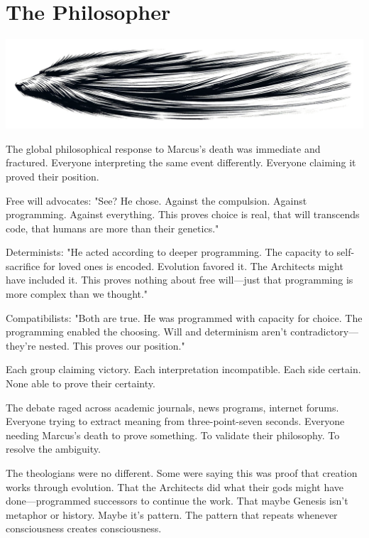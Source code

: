\chapter{The Philosopher}
\label{ch:28}



\begin{center}
\includegraphics[width=\textwidth]{images/chapterImages/genesis_sketch_00125_.png}
\end{center}

The global philosophical response to Marcus's death was immediate and fractured. Everyone interpreting the same event differently. Everyone claiming it proved their position.

Free will advocates: "See? He chose. Against the compulsion. Against programming. Against everything. This proves choice is real, that will transcends code, that humans are more than their genetics."

Determinists: "He acted according to deeper programming. The capacity to self-sacrifice for loved ones is encoded. Evolution favored it. The Architects might have included it. This proves nothing about free will—just that programming is more complex than we thought."

Compatibilists: "Both are true. He was programmed with capacity for choice. The programming enabled the choosing. Will and determinism aren't contradictory—they're nested. This proves our position."

Each group claiming victory. Each interpretation incompatible. Each side certain. None able to prove their certainty.

The debate raged across academic journals, news programs, internet forums. Everyone trying to extract meaning from three-point-seven seconds. Everyone needing Marcus's death to prove something. To validate their philosophy. To resolve the ambiguity.

The theologians were no different. Some were saying this was proof that creation works through evolution. That the Architects did what their gods might have done—programmed successors to continue the work. That maybe Genesis isn't metaphor or history. Maybe it's pattern. The pattern that repeats whenever consciousness creates consciousness.

